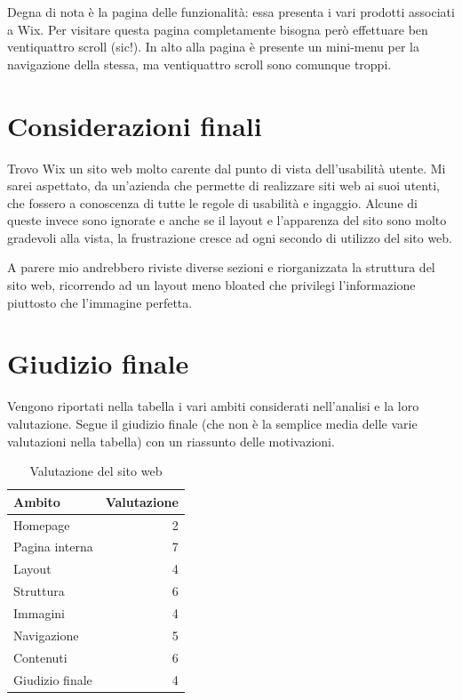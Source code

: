 \documentclass[11pt,a4paper]{article}
\newcommand*{\wix}{Wix}
\begin{document}
Degna di nota è la pagina delle funzionalità: essa presenta i vari
prodotti associati a \wix{}. Per visitare questa pagina completamente
bisogna però effettuare ben ventiquattro scroll (sic!). In alto alla
pagina è presente un mini-menu per la navigazione della stessa, ma
ventiquattro scroll sono comunque troppi.

\section{Considerazioni finali}
\label{sec:final-remarks}

Trovo \wix{} un sito web molto carente dal punto di vista
dell'usabilità utente. Mi sarei aspettato, da un'azienda che permette
di realizzare siti web ai suoi utenti, che fossero a conoscenza di
tutte le regole di usabilità e ingaggio. Alcune di queste invece sono
ignorate e anche se il layout e l'apparenza del sito sono molto
gradevoli alla vista, la frustrazione cresce ad ogni secondo di
utilizzo del sito web. 

A parere mio andrebbero riviste diverse sezioni e riorganizzata la
struttura del sito web, ricorrendo ad un layout meno bloated che
privilegi l'informazione piuttosto che l'immagine perfetta. 

\section{Giudizio finale}
\label{sec:final-vote}

Vengono riportati nella tabella i vari ambiti considerati nell'analisi
e la loro valutazione. Segue il giudizio finale (che non è la semplice
media delle varie valutazioni nella tabella) con un riassunto delle
motivazioni.

\begin{table}
  \centering
  \begin{tabular}{||l|r||}
    \hline
    \textbf{Ambito} & \textbf{Valutazione} \\
    \hline\hline
     Homepage & 2 \\ 
     Pagina interna & 7 \\
     Layout & 4 \\
     Struttura & 6 \\
     Immagini & 4 \\
     Navigazione & 5 \\
     Contenuti & 6 \\
     \hline\hline
     Giudizio finale & 4 \\
     \hline
  \end{tabular}
  \caption{Valutazione del sito web}
  \label{table:rating}
\end{table}
\end{document}
